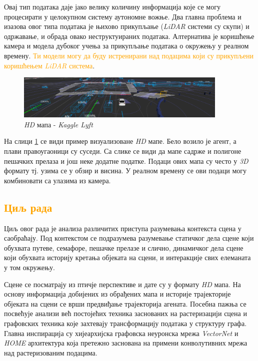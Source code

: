 \documentclass[11pt,oneside]{memoir}
\begin{document}
Овај тип података даје јако велику количину информација које се могу процесирати у целокупном систему аутономне вожње. Два главна проблема
и изазова овог типа података је њихово прикупљање (\textit{LiDAR} системи су скупи) и одржавање, и обрада овако неструктуираних података. Алтернатива
је коришћење камера и модела дубоког учења за прикупљање података о окружењу у реалном времену. \textcolor{orange}{Ти модели могу да буду истренирани
над подацима који су прикупљени коришћењем \textit{LiDAR} система}.

\begin{figure}[H]
  \centering
  \includegraphics[width=0.9\textwidth]{images/lyft-hd-map.png}
  \caption{\textit{HD} мапа - \textit{Kaggle Lyft} \cite{kaggle_lyft} \label{kaggle-lyft-example}}
\end{figure}

На слици \ref{kaggle-lyft-example} се види пример визуализоване \textit{HD} мапе. Бело возило је агент, а плави правоугаоници су суседи. 
Са слике се види да мапе садрже и полигоне пешачких прелаза и још неке додатне податке. Подаци ових мапа су често у \textit{3D} формату
тј. узима се у обзир и висина. У реалном времену се ови подаци могу комбиновати са улазима из камера. 

\textcolor{orange}{\section{Циљ рада}}

Циљ овог рада је анализа различитих приступа разумевања контекста сцена у саобраћају. 
Под контекстом се подразумева разумевање статичког дела сцене који обухвата путеве,
семафоре, пешачке прелазе и слично, динамичког дела сцене који обухвата историју кретања објеката на сцени, и интеракције 
свих елеманата у том окружењу. 

Сцене се посматрају из птичје перспективе
и дате су у формату \textit{HD} мапа. На основу информација добијених из обрађених мапа и историје трајекторије објеката
на сцени се врши предвиђање трајекторија агената. Посебна пажња се посвећује анализи већ постојећих
техника заснованих на растеризацији сцена и графовских техника које захтевају трансформацију података у структуру графа. 
Главна инспирација су хијеархијска графовска неуронска мрежа \textit{VectorNet} \cite{vectornet} и \textit{HOME} \cite{home}
архитектура која претежно заснована на примени конволутивних мрежа над растеризованим подацима. 
\end{document}
